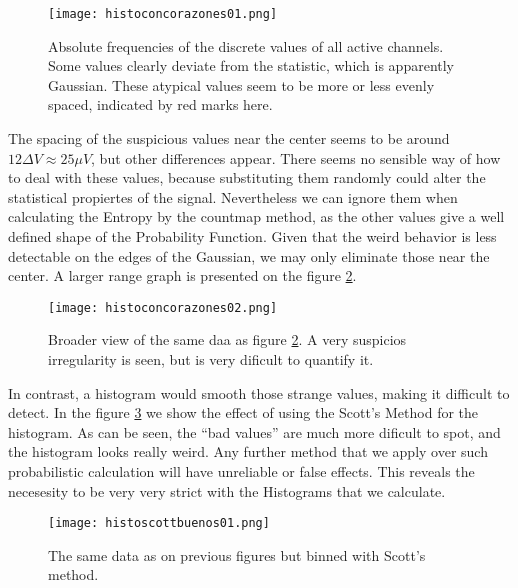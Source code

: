\documentclass[10pt]{article}
\begin{document}
\begin{figure}
  \begin{center}
    \texttt{[image: histoconcorazones01.png]}
    \end{center}
 \caption{Absolute frequencies of the discrete values of all active channels.
   Some values clearly deviate from the statistic, which is apparently
   Gaussian. These atypical values seem to be more or less
   evenly spaced, indicated by red marks here.}\label{histocountmap1}
\end{figure}

The spacing of the suspicious values near the center seems to be
around $12 \Delta V \approx 25 \mu V$, but other differences appear.
There seems no sensible way of how to deal with these values, because
substituting them randomly could alter the statistical propiertes of the
signal. Nevertheless we can ignore them when calculating the Entropy
by the countmap method, as the other values give a well defined shape
of the Probability Function. Given that the weird behavior is less
detectable on the edges of the Gaussian, we may only eliminate those
near the center. A larger range graph is presented on the figure
\ref{histocountmap2}.


\begin{figure}
  \begin{center}
 \texttt{[image: histoconcorazones02.png]}   
  \end{center}
 
 \caption{Broader view of the same daa as figure \ref{histocountmap2}.
   A very suspicios irregularity is seen, but is very dificult to
 quantify it.}
 \label{histocountmap2}   
\end{figure}

In contrast, a histogram would smooth those strange values, making it
difficult to detect. In the figure \ref{histoscott01} we show the
effect of using the Scott's Method for the histogram. As can be seen,
the ``bad values'' are much more dificult to spot, and the
histogram looks really weird. Any further method that we apply over such
probabilistic calculation will have unreliable or false effects. This reveals
the necesesity to be very very strict with the Histograms that we calculate.

\begin{figure}
  \begin{center}
  \texttt{[image: histoscottbuenos01.png]}  
  \end{center}
    \caption{The same data as on previous figures but binned with Scott's method.}
  \label{histoscott01}
\end{figure}
\end{document}
